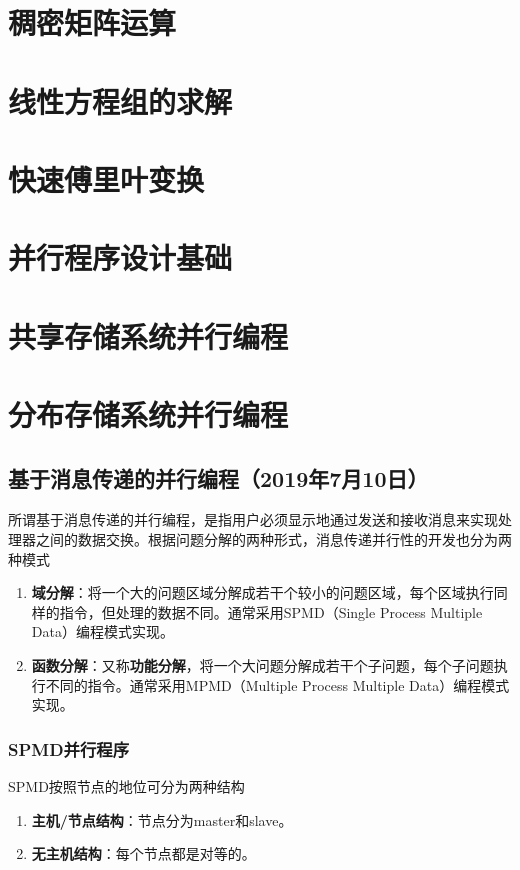 \documentclass{article}
\begin{document}
		\section{稠密矩阵运算}
		\section{线性方程组的求解}
		\section{快速傅里叶变换}
		\section{并行程序设计基础}
		\section{共享存储系统并行编程}
		\section{分布存储系统并行编程}
			\subsection{基于消息传递的并行编程（2019年7月10日）}
				所谓基于消息传递的并行编程，是指用户必须显示地通过发送和接收消息来实现处理器之间的数据交换。根据问题分解的两种形式，消息传递并行性的开发也分为两种模式
				\begin{enumerate}
					\item \textbf{域分解}：将一个大的问题区域分解成若干个较小的问题区域，每个区域执行同样的指令，但处理的数据不同。通常采用SPMD（Single Process Multiple Data）编程模式实现。
					\item \textbf{函数分解}：又称\textbf{功能分解}，将一个大问题分解成若干个子问题，每个子问题执行不同的指令。通常采用MPMD（Multiple Process Multiple Data）编程模式实现。
				\end{enumerate}
				\subsubsection{SPMD并行程序}
					SPMD按照节点的地位可分为两种结构
					\begin{enumerate}
						\item \textbf{主机/节点结构}：节点分为master和slave。
						\item \textbf{无主机结构}：每个节点都是对等的。
					\end{enumerate}
\end{document}
